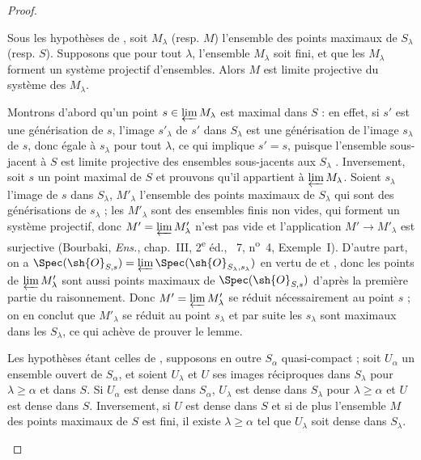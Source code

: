 \begin{proof}
\begin{lemma}[20.3.8.3]
\label{IV.20.3.8.3}
Sous les hypothèses de , soit $M_\lambda$ \textup{(resp. $M$)} l'ensemble des points maximaux de $S_\lambda$ \textup{(resp. $S$)}.
Supposons que pour tout $\lambda$, l'ensemble $M_\lambda$ soit fini, et que les $M_\lambda$ forment un système projectif d'ensembles.
Alors $M$ est limite projective du système des $M_\lambda$.
\end{lemma}

Montrons d'abord qu'un point $s\in\varprojlim M_\lambda$ est maximal dans $S$ : en effet, si $s'$ est une générisation de $s$, l'image $s'_\lambda$ de $s'$ dans $S_\lambda$ est une générisation de l'image $s_\lambda$ de $s$, donc égale à $s_\lambda$ pour tout $\lambda$, ce qui implique $s'=s$, puisque l'ensemble sous-jacent à $S$ est limite projective des ensembles sous-jacents aux $S_\lambda$ .
Inversement, soit $s$ un point maximal de $S$ et prouvons qu'il appartient à $\varprojlim M_\lambda$.
Soient $s_\lambda$ l'image de $s$ dans $S_\lambda$, $M'_\lambda$ l'ensemble des points maximaux de $S_\lambda$ qui sont des générisations de $s_\lambda$ ; les $M'_\lambda$ sont des ensembles finis non vides, qui forment un système projectif, donc $M'=\varprojlim M'_\lambda$ n'est pas vide et l'application $M'\to M'_\lambda$ est surjective (Bourbaki, \emph{Ens.}, chap.~III, 2\textsuperscript{e} éd., \textsection~7, n\textsuperscript{o}~4, Exemple~I).
D'autre part, on a $\Spec(\sh{O}_{S,s})=\varprojlim\Spec(\sh{O}_{S_\lambda,s_\lambda})$ en vertu de  et , donc les points de $\varprojlim M'_\lambda$ sont aussi points maximaux de $\Spec(\sh{O}_{S,s})$ d'après la première partie du raisonnement.
Donc $M'=\varprojlim M'_\lambda$ se réduit nécessairement au point $s$ ; on en conclut que $M'_\lambda$ se réduit au point $s_\lambda$ et par suite les $s_\lambda$ sont maximaux dans les $S_\lambda$, ce qui achève de prouver le lemme.

\begin{lemma}[20.3.8.4]
\label{IV.20.3.8.4}
Les hypothèses étant celles de , supposons en outre $S_\alpha$ quasi-compact ; soit $U_\alpha$ un ensemble ouvert de $S_\alpha$, et soient $U_\lambda$ et $U$ ses images réciproques dans $S_\lambda$ pour $\lambda\geq\alpha$ et dans $S$.
Si $U_\alpha$ est dense dans $S_\alpha$, $U_\lambda$ est dense dans $S_\lambda$ pour $\lambda\geq\alpha$ et $U$ est dense dans $S$.
Inversement, si $U$ est dense dans $S$ et si de plus l'ensemble $M$ des points maximaux de $S$ est fini, il existe $\lambda\geq\alpha$ tel que $U_\lambda$ soit dense dans $S_\lambda$.
\end{lemma}


\end{proof}
